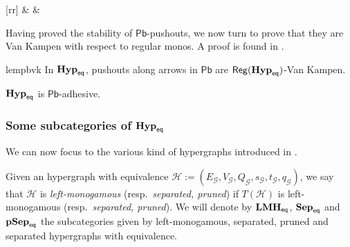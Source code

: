 \documentclass[3p]{elsarticle}
\newcommand{\pbc}{\mathsf{Pb}}
\newcommand{\catname}[1]{\textbf{\textup{#1}}}
\newcommand{\EqHyp}{\catname{Hyp}_{\mathsf{eq}}} %
\newcommand{\EqsHyp}{\catname{Sep}_{\mathsf{eq}}}
\newcommand{\EqpsHyp}{\catname{pSep}_{\mathsf{eq}}}
\newcommand{\Eqlmo}{\catname{LMH}_{\mathsf{eq}}}
\newcommand{\reg}{\mathsf{Reg}}
\theoremstyle{remark}
\theoremstyle{definition}
\begin{document}
\begin{exa}
\begin{minipage}[r]{.60\linewidth}
{
                \ar@{>->}[rr] & & 
                 }
  \end{minipage}
\end{exa}


Having proved the stability of $\pbc$-pushouts, we now turn to prove that they are Van Kampen with respect to regular monos.
%
A proof is found in .

\begin{restatable}{lem}{pbvk}\label{lemma:van_kampen}
	In $\EqHyp$, pushouts along arrows in $\pbc$ are $\reg(\EqHyp)$-Van Kampen.
\end{restatable}

\begin{cor}\label{cor:eqade}
	$\EqHyp$ is $\pbc$-adhesive.
\end{cor}

\subsubsection{Some subcategories of $\EqHyp$}

We can now focus to the various kind of hypergraphs introduced in .

\begin{defi}Given an hypergraph with equivalence $\mathcal{H}:=(E_\mathcal{G}, V_{\mathcal{G}}, Q_\mathcal{G}, s_\mathcal{G}, t_\mathcal{G}, q_\mathcal{G})$, we say that $\mathcal{H}$ is \emph{left-monogamous} (resp.~\emph{separated, pruned}) if $T(\mathcal{H})$ is left-monogamous (resp.~\emph{separated, pruned}). We will denote by $\Eqlmo$, $\EqsHyp$ and $\EqpsHyp$ the  subcategories  given by left-monogamous, separated, pruned and separated hypergraphs with equivalence.
\end{defi}
\end{document}
